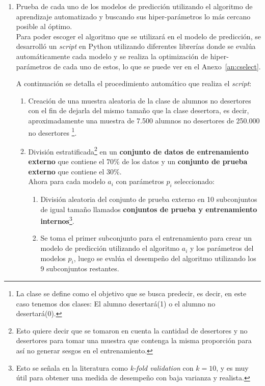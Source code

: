 \begin{enumerate}

\item Prueba de cada uno de los modelos de predicción utilizando el algoritmo de aprendizaje automatizado y buscando sus hiper-parámetros lo más cercano posible al óptimo. \\ \hfill
Para poder escoger el algoritmo que se utilizará en el modelo de predicción, se desarrolló un \textit{script} en Python utilizando diferentes librerías donde se evalúa automáticamente cada modelo y se realiza la optimización de hiper-parámetros de cada uno de estos, lo que se puede ver en el Anexo~\ref{an:cselect}.

A continuación se detalla el procedimiento automático que realiza el \textit{script}:\\
\begin{enumerate}
\item Creación de una muestra aleatoria de la clase de alumnos no desertores con el fin de dejarla del mismo tamaño que la clase desertora, es decir, aproximadamente una muestra de 7.500 alumnos no desertores de 250.000 no desertores \footnote{La clase se define como el objetivo que se busca predecir, es decir, en este caso tenemos dos clases: El alumno desertará(1) o el alumno no desertará(0).}.
\item División estratificada\footnote{Esto quiere decir que se tomaron en cuenta la cantidad de desertores y no desertores para tomar una muestra que contenga la misma proporción para así no generar sesgos en el entrenamiento.} en un \textbf{conjunto de datos de entrenamiento externo} que contiene el 70\% de los datos y un \textbf{conjunto de prueba externo} que contiene el 30\%.
\\ \hfill
Ahora para cada modelo $a_i$ con parámetros $p_i$ seleccionado:
    \begin{enumerate}
    \item División aleatoria del conjunto de prueba externo en 10 subconjuntos de igual tamaño llamados \textbf{conjuntos de prueba y entrenamiento internos}\footnote{Esto se señala en la literatura como \textit{k-fold validation} con $k = 10$, y es muy útil para obtener una medida de desempeño con baja varianza y realista.}.
    \item Se toma el primer subconjunto para el entrenamiento para crear un modelo de predicción utilizando el algoritmo $a_i$ y los parámetros del modelos $p_i$, luego se evalúa el desempeño del algoritmo utilizando los 9 subconjuntos restantes.

\end{enumerate}
\end{enumerate}
\end{enumerate}
